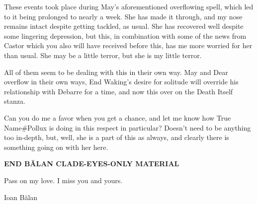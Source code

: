 These events took place during May's aforementioned overflowing spell, which led to it being prolonged to nearly a week. She has made it through, and my nose remains intact despite getting tackled, as usual. She has recovered well despite some lingering depression, but this, in combination with some of the news from Castor which you also will have received before this, has me more worried for her than usual. She may be a little terror, but she is my little terror.

All of them seem to be dealing with this in their own way. May and Dear overflow in their own ways, End Waking's desire for solitude will override his relationship with Debarre for a time, and now this over on the Death Itself stanza.

Can you do me a favor when you get a chance, and let me know how True Name\#Pollux is doing in this respect in particular? Doesn't need to be anything too in-depth, but, well, she is a part of this as always, and clearly there is something going on with her here.

\begin{center}
\textbf{END BĂLAN CLADE-EYES-ONLY MATERIAL}
\end{center}

Pass on my love. I miss you and yours.

Ioan Bălan
